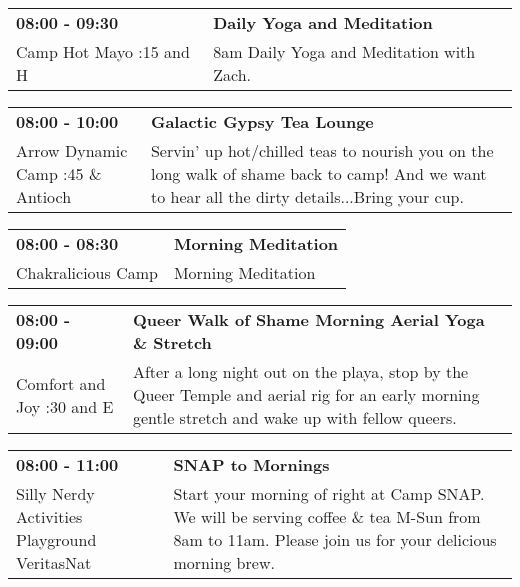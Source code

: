 \begin{tabular}{ p{1in} p{2.2in} }
    \textbf{08:00 - 09:30} & \textbf{Daily Yoga and Meditation} \\
    Camp Hot Mayo \newline 9:15 and H & 8am Daily Yoga and Meditation with Zach. \\
    \hline 
\end{tabular}
    
\begin{tabular}{ p{1in} p{2.2in} }
    \textbf{08:00 - 10:00} & \textbf{Galactic Gypsy Tea Lounge} \\
    Arrow Dynamic Camp \newline 9:45 \& Antioch & Servin' up hot/chilled teas to nourish you on the long walk of shame back to camp! And we want to hear all the dirty details...Bring your cup. \\
    \hline 
\end{tabular}
    
\begin{tabular}{ p{1in} p{2.2in} }
    \textbf{08:00 - 08:30} & \textbf{Morning Meditation} \\
    Chakralicious Camp \newline  & Morning Meditation \\
    \hline 
\end{tabular}
    
\begin{tabular}{ p{1in} p{2.2in} }
    \textbf{08:00 - 09:00} & \textbf{Queer Walk of Shame Morning Aerial Yoga \& Stretch} \\
    Comfort and Joy \newline 7:30 and E & After a long night out on the playa, stop by the Queer Temple and aerial rig for an early morning gentle stretch and wake up with fellow queers. \\
    \hline 
\end{tabular}
    
\begin{tabular}{ p{1in} p{2.2in} }
    \textbf{08:00 - 11:00} & \textbf{SNAP to Mornings} \\
    Silly Nerdy Activities Playground \newline VeritasNat & Start your morning of right at Camp SNAP. We will be serving coffee \& tea M-Sun from 8am to 11am. Please join us for your delicious morning brew. \\
    \hline 
\end{tabular}
    

